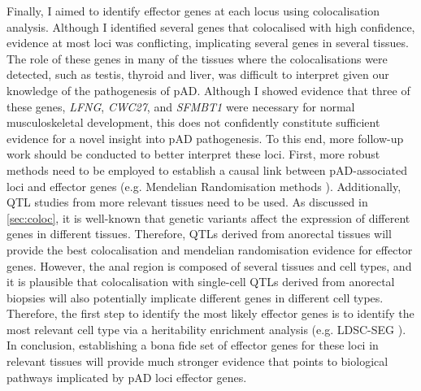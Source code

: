 Finally, I aimed to identify effector genes at each locus using colocalisation analysis. Although I identified several genes that colocalised with high confidence, evidence at most loci was conflicting, implicating several genes in several tissues. The role of these genes in many of the tissues where the colocalisations were detected, such as testis, thyroid and liver, was difficult to interpret given our knowledge of the pathogenesis of pAD. Although I showed evidence that three of these genes, \textit{LFNG}, \textit{CWC27}, and \textit{SFMBT1} were necessary for normal musculoskeletal development, this does not confidently constitute sufficient evidence for a novel insight into pAD pathogenesis. To this end, more follow-up work should be conducted to better interpret these loci. First, more robust methods need to be employed to establish a causal link between pAD-associated loci and effector genes (e.g. Mendelian Randomisation methods \cite{Sanderson2022-nm}). Additionally, QTL studies from more relevant tissues need to be used. As discussed in \ref{sec:coloc}, it is well-known that genetic variants affect the expression of different genes in different tissues. Therefore, QTLs derived from anorectal tissues will provide the best colocalisation and mendelian randomisation evidence for effector genes. However, the anal region is composed of several tissues and cell types, and it is plausible that colocalisation with single-cell QTLs derived from anorectal biopsies will also potentially implicate different genes in different cell types. Therefore, the first step to identify the most likely effector genes is to identify the most relevant cell type via a heritability enrichment analysis (e.g. LDSC-SEG \cite{Finucane2018-mx}). In conclusion, establishing a bona fide set of effector genes for these loci in relevant tissues will provide much stronger evidence that points to biological pathways implicated by pAD loci effector genes. 

